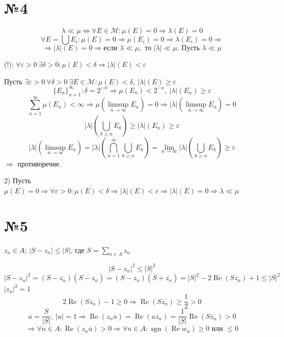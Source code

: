 \documentclass{article}
\begin{document}
\section*{№4}

\[ \lambda \ll \mu \Leftrightarrow \forall E \in \mathcal{M}: \mu(E) = 0 \Rightarrow \lambda(E) = 0 \]
\[ \forall E = \bigcup E_i : \mu(E) = 0 \Rightarrow \mu(E_i) = 0 \Rightarrow \lambda(E_i) = 0 \Rightarrow \]
\[ \Rightarrow |\lambda|(E) = 0 \Rightarrow \text{если } \lambda \ll \mu, \text{ то } |\lambda| \ll \mu. \text{ Пусть } \lambda \ll \mu \]

(!): \(\forall \varepsilon > 0 \ \exists \delta > 0: \mu(E) < \delta \Rightarrow |\lambda|(E) < \varepsilon\)

Пусть \(\exists \varepsilon > 0 \ \forall \delta > 0 \ \exists E \in \mathcal{M}: \mu(E) < \delta, \ |\lambda|(E) \ge \varepsilon\)
\[ \{E_n\}_{n=1}^{\infty} : \delta = 2^{-n} \Rightarrow \mu(E_n) < 2^{-n}, \ |\lambda|(E_n) \ge \varepsilon \]
\[ \sum_{n=1}^{\infty} \mu(E_n) < \infty \Rightarrow \mu(\limsup_{n\to\infty} E_n) = 0 \Rightarrow |\lambda|(\limsup_{n\to\infty} E_n) = 0 \]
\[ |\lambda|(\bigcup_{k \ge n} E_k) \ge |\lambda|(E_n) \ge \varepsilon \]
\[ |\lambda|(\limsup_{n\to\infty} E_n) = |\lambda|(\bigcap_{n=1}^{\infty} \bigcup_{k \ge n} E_k) = \lim_{n\to\infty} |\lambda|(\bigcup_{k \ge n} E_k) \ge \varepsilon \]
 \(\Rightarrow\) противоречие. 

2) Пусть \(\mu(E) = 0 \Rightarrow \forall \varepsilon > 0 : \mu(E) < \delta \Rightarrow |\lambda|(E) < \varepsilon \Rightarrow |\lambda|(E) = 0 \Rightarrow \lambda \ll \mu\)

\section*{№5}

\(z_n \in A\); \(|S - z_n| \le |S|\), где \(S = \sum_{n \in A} z_n\)

\[ |S - z_n|^2 \le |S|^2 \]
\[ |S - z_n|^2 = (S - z_n)(\overline{S - z_n}) = (S - z_n)(\overline{S} + \overline{z_n}) = |S|^2 - 2\operatorname{Re}(S\overline{z_n}) + 1 \le |S|^2 \]
 \(|z_n|^2 = 1\)\text{)}
\[ 2\operatorname{Re}(S\overline{z_n}) - 1 \ge 0 \Rightarrow \operatorname{Re}(S\overline{z_n}) \ge \frac{1}{2} > 0 \]
\[ u = \frac{S}{|S|}, \ |u| = 1 \Rightarrow \operatorname{Re}(z_n \overline{u}) = \operatorname{Re}(u\overline{z_n}) = \frac{1}{|S|}\operatorname{Re}(S\overline{z_n}) > 0 \]
\[ \Rightarrow \forall n \in A: \operatorname{Re}(z_n \overline{u}) > 0 \Rightarrow \forall n \in A: \operatorname{sgn}(\operatorname{Re} w_n) \ge 0 \text{ или } \le 0 \]
\end{document}
